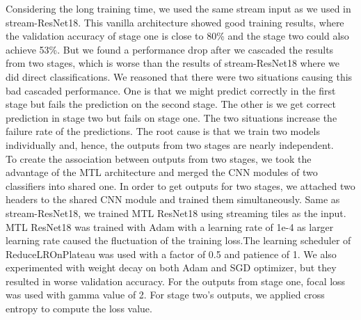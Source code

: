 \documentclass[10pt,twocolumn,letterpaper]{article}
\begin{document}
 


 Considering the long training time, we used the same stream input as we used in stream-ResNet18. This vanilla architecture showed good training results, where the validation accuracy of stage one is close to 80\% and the stage two could also achieve 53\%. But we found a performance drop after we cascaded the results from two stages, which is worse than the results of stream-ResNet18 where we did direct classifications. We reasoned that there were two situations causing this bad cascaded performance. One is that we might predict correctly in the first stage but fails the prediction on the second stage. The other is we get correct prediction in stage two but fails on stage one. The two situations increase the failure rate of the predictions. The root cause is that we train two models individually and, hence, the outputs from two stages are nearly independent.  \\
 To create the association between outputs from two stages, we took the advantage of the MTL architecture and merged the CNN modules of two classifiers into shared one. In order to get outputs for two stages, we attached two headers to the shared CNN module and trained them simultaneously. Same as stream-ResNet18, we trained MTL ResNet18 using streaming tiles as the input. MTL ResNet18 was trained with Adam with a learning rate of 1e-4 as larger learning rate caused the fluctuation of the training loss.The learning scheduler of ReduceLROnPlateau was used with a factor of 0.5 and patience of 1. We also experimented with weight decay on both Adam and SGD optimizer, but they resulted in worse validation accuracy. For the outputs from stage one, focal loss was used with gamma value of 2. For stage two's outputs, we applied cross entropy to compute the loss value. \\
\end{document}
